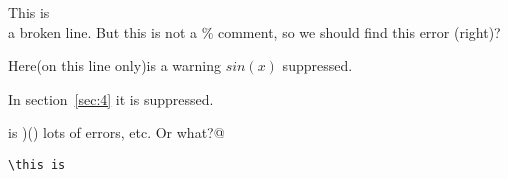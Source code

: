 This is\\%
a broken line.
But this is not a \% comment, so we should find this error (right)?

Here(on this line only)is a warning $sin(x)$ suppressed. %

In section~\ref{sec:4} it is suppressed. %



\verb@\this is )() lots of errors, etc. Or what?@

\begin{verbatim}
\this is
\end{verbatim}


\[\]

